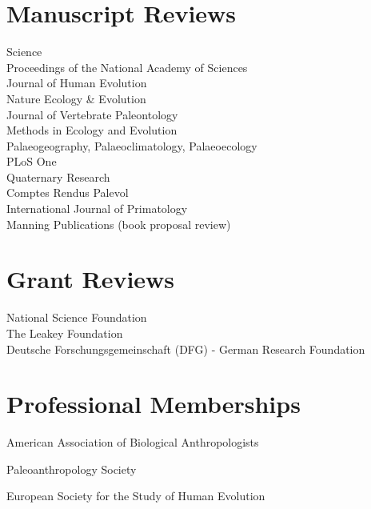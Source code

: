 \documentclass{article}
\newenvironment{mylist}
{\begin{description}[style=unboxed,leftmargin=1.3cm]}
{\end{description}}
\begin{document}
\section*{Manuscript Reviews}
Science\\[4pt]
Proceedings of the National Academy of Sciences\\[4pt]
Journal of Human Evolution\\[4pt]
Nature Ecology \& Evolution\\[4pt]
Journal of Vertebrate Paleontology\\[4pt]
Methods in Ecology and Evolution\\[4pt]
Palaeogeography, Palaeoclimatology, Palaeoecology\\[4pt]
PLoS One\\[4pt]
Quaternary Research\\[4pt]
Comptes Rendus Palevol\\[4pt]
International Journal of Primatology\\[4pt]
Manning Publications (book proposal review)\\

\section*{Grant Reviews}
National Science Foundation\\[4pt]
The Leakey Foundation\\[4pt]
Deutsche Forschungsgemeinschaft (DFG) - German Research Foundation\\

\section*{Professional Memberships}
\begin{mylist}
\item[] American Association of Biological Anthropologists
\item[] Paleoanthropology Society
\item[] European Society for the Study of Human Evolution
\end{mylist}
\end{document}

